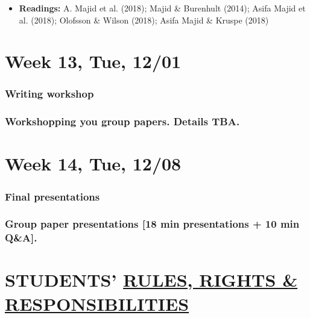 \documentclass[11pt,man]{article}
\providecommand{\tightlist}{%
  \setlength{\itemsep}{0pt}\setlength{\parskip}{0pt}}
\begin{document}
\begin{itemize}
\tightlist
\item
  \textbf{Readings:} A. Majid et al. (2018); Majid \& Burenhult (2014);
  Asifa Majid et al. (2018); Olofsson \& Wilson (2018); Asifa Majid \&
  Kruspe (2018)
\end{itemize}

\hypertarget{week-13-tue-1201}{%
\section{Week 13, Tue, 12/01}\label{week-13-tue-1201}}

\hypertarget{writing-workshop}{%
\subsubsection{Writing workshop}\label{writing-workshop}}

\hypertarget{workshopping-you-group-papers.-details-tba.}{%
\subsubsection{Workshopping you group papers. Details
TBA.}\label{workshopping-you-group-papers.-details-tba.}}

\hypertarget{week-14-tue-1208}{%
\section{Week 14, Tue, 12/08}\label{week-14-tue-1208}}

\hypertarget{final-presentations}{%
\subsubsection{Final presentations}\label{final-presentations}}

\hypertarget{group-paper-presentations-18-min-presentations-10-min-qa.}{%
\subsubsection{Group paper presentations {[}18 min presentations + 10
min
Q\&A{]}.}\label{group-paper-presentations-18-min-presentations-10-min-qa.}}

\newpage

\hypertarget{students-rules-rights-responsibilities}{%
\section{\texorpdfstring{STUDENTS'
\href{https://guide.wisc.edu/graduate/}{RULES, RIGHTS \&
RESPONSIBILITIES}}{STUDENTS' RULES, RIGHTS \& RESPONSIBILITIES}}\label{students-rules-rights-responsibilities}}
\end{document}
